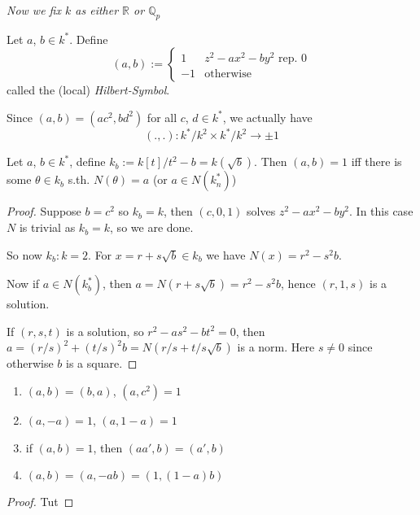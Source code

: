 {\em Now we fix $k$ as either $\mathbb R$ or $\mathbb Q_p$}

\begin{definition}
  Let $a$, $b\in k^*$.
  Define
  $$(a,b) := \begin{cases} 1 & z^2-ax^2-by^2 \text{ rep. } 0\\
                           -1 & \text{otherwise}
  \end{cases}$$
  called the (local) {\em Hilbert-Symbol}.
\end{definition}

\begin{remark}
  Since $(a,b) = (ac^2, bd^2)$ for all $c$, $d\in k^*$, we actually have
  $$(.,.): k^*/k^2 \times k^*/k^2\to \pm 1$$
\end{remark}

\begin{proposition}
  Let $a$, $b\in k^*$, define $k_b := k[t]/t^2-b = k(\sqrt b)$. Then
  $(a,b) = 1$ iff there is some $\theta \in k_b$ s.th. $N(\theta) = a$
  (or $a\in N(k_n^*)$)
\end{proposition}
\begin{proof}
  Suppose $b = c^2$ so $k_b = k$, then $(c, 0, 1)$ solves
  $z^2-ax^2-by^2$. In this case $N$ is trivial as $k_b = k$, so 
  we are done.

  So now $k_b:k = 2$. For $x = r+s\sqrt b\in k_b$ we have
  $N(x) = r^2-s^2b$.

  Now if $a\in N(k_b^*)$, then $a = N(r+s\sqrt b) = r^2-s^2b$, 
  hence $(r, 1, s)$ is a solution.

  If $(r, s, t)$ is a solution, so $r^2-as^2-bt^2= 0$,
  then $a = (r/s)^2 + (t/s)^2b = N(r/s + t/s\sqrt b)$ is a
  norm. Here $s\ne 0$ since otherwise $b$ is a square.
\end{proof}

\begin{proposition}
  \begin{enumerate} Let $a$, $a'$, $b$, $c\in k^*$, then
    \item $(a,b) = (b,a)$, $(a, c^2) = 1$
    \item $(a, -a) = 1$, $(a, 1-a) = 1$
    \item if $(a,b) = 1$, then $(aa', b) = (a', b)$
    \item $(a, b) = (a, -ab) = (1, (1-a)b)$
  \end{enumerate}
\end{proposition}
\begin{proof}
  Tut
\end{proof}

